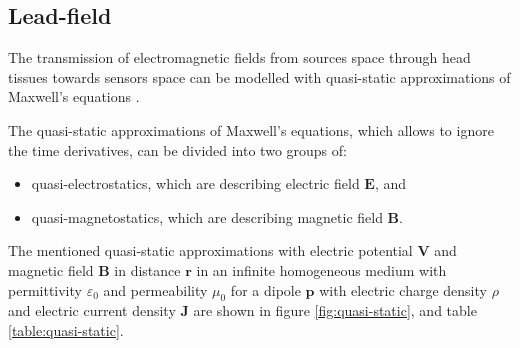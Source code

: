 \subsection{Lead-field}
\label{sec:Leadfield} 
The transmission of electromagnetic fields from sources space through head tissues towards sensors space can be modelled with quasi-static approximations of Maxwell’s equations \cite{Sarvas1987}.

The quasi-static approximations of Maxwell’s equations, which allows to ignore the time derivatives, can be divided into two groups of: 
\begin{itemize}
\item quasi-electrostatics, which are describing electric field $\boldsymbol{E}$, and
\item quasi-magnetostatics, which are describing magnetic field $\boldsymbol{B}$.
\end{itemize} 

The mentioned quasi-static approximations with electric potential $\boldsymbol{V}$ and magnetic field $\boldsymbol{B}$ in distance $\boldsymbol{r}$ in an infinite homogeneous medium with permittivity $\varepsilon_0$ and permeability $\mu_0$ for a dipole $\boldsymbol{p}$ with electric charge density $\rho$ and electric current density $\boldsymbol{J}$ are shown in figure \ref{fig:quasi-static}, and table \ref{table:quasi-static}.

